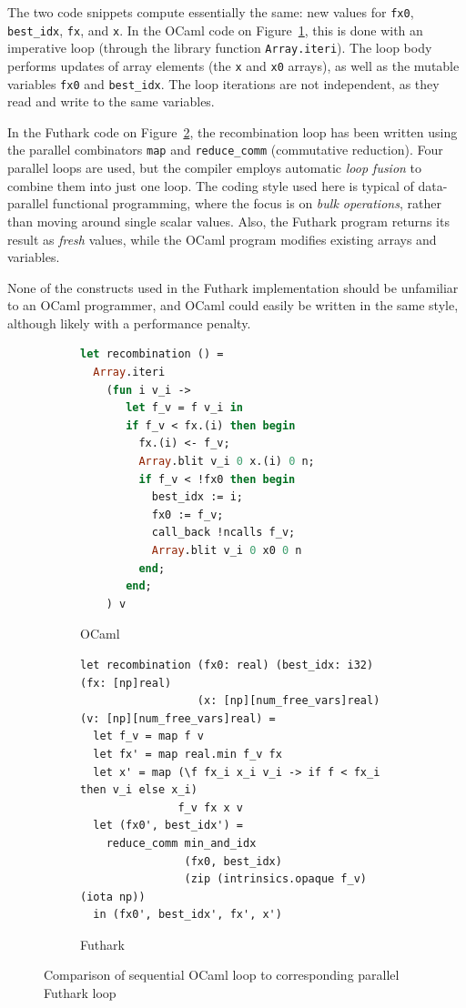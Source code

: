 \documentclass{article}
\begin{document}
The two code snippets compute essentially the same: new values for
\texttt{fx0}, \texttt{best\_idx}, \texttt{fx}, and \texttt{x}.  In the
OCaml code on Figure~\ref{fig:ocaml-loop}, this is done with an
imperative loop (through the library function \texttt{Array.iteri}).
The loop body performs updates of array elements (the \texttt{x} and
\texttt{x0} arrays), as well as the mutable variables \texttt{fx0} and
\texttt{best\_idx}.  The loop iterations are not independent, as they
read and write to the same variables.

In the Futhark code on Figure~\ref{fig:futhark-loop}, the
recombination loop has been written using the parallel combinators
\texttt{map} and \texttt{reduce\_comm} (commutative reduction).  Four
parallel loops are used, but the compiler employs automatic
\textit{loop fusion} to combine them into just one loop.  The coding
style used here is typical of data-parallel functional programming,
where the focus is on \textit{bulk operations}, rather than moving
around single scalar values.  Also, the Futhark program returns its
result as \textit{fresh} values, while the OCaml program modifies
existing arrays and variables.

None of the constructs used in the Futhark implementation should be
unfamiliar to an OCaml programmer, and OCaml could easily be written
in the same style, although likely with a performance penalty.

\begin{figure}
  \centering
  \begin{subfigure}{1\textwidth}
\begin{lstlisting}[language=Caml]
let recombination () =
  Array.iteri
    (fun i v_i ->
       let f_v = f v_i in
       if f_v < fx.(i) then begin
         fx.(i) <- f_v;
         Array.blit v_i 0 x.(i) 0 n;
         if f_v < !fx0 then begin
           best_idx := i;
           fx0 := f_v;
           call_back !ncalls f_v;
           Array.blit v_i 0 x0 0 n
         end;
       end;
    ) v
\end{lstlisting}
    \caption{OCaml}
    \label{fig:ocaml-loop}
  \end{subfigure}

  \begin{subfigure}{1\textwidth}
\begin{lstlisting}
let recombination (fx0: real) (best_idx: i32)  (fx: [np]real)
                  (x: [np][num_free_vars]real) (v: [np][num_free_vars]real) =
  let f_v = map f v
  let fx' = map real.min f_v fx
  let x' = map (\f fx_i x_i v_i -> if f < fx_i then v_i else x_i)
               f_v fx x v
  let (fx0', best_idx') =
    reduce_comm min_and_idx
                (fx0, best_idx)
                (zip (intrinsics.opaque f_v) (iota np))
  in (fx0', best_idx', fx', x')
\end{lstlisting}
    \caption{Futhark}
    \label{fig:futhark-loop}
  \end{subfigure}
  \caption{Comparison of sequential OCaml loop to corresponding parallel Futhark loop}
  \label{fig:loop-comparison}
\end{figure}
\end{document}
